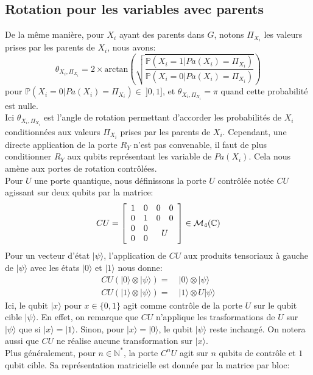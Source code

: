 \subsection{Rotation pour les variables avec parents}
\label{calcul_multi_rot}
De la même manière, pour $X_i$ ayant des parents dans $G$, notons $\Pi_{X_i}$ les valeurs prises par les parents de $X_i$, nous avons:
\[
\theta_{X_i,\Pi_{X_i}} = 
2\times\mathrm{arctan}\left(\sqrt{\frac{\displaystyle \mathbb{P}(X_i=1|Pa(X_i)=\Pi_{X_i})}{\displaystyle \mathbb{P}(X_i=0|Pa(X_i)=\Pi_{X_i})}}\right) 
\]
pour $\mathbb{P}(X_i=0|Pa(X_i)=\Pi_{X_i}) \in \ ]0,1]$, et
$\theta_{X_i,\Pi_{X_i}} =  \pi$ quand cette probabilité est nulle.
\\
Ici $\theta_{X_i,\Pi_{X_i}}$ est l'angle de rotation permettant d'accorder les probabilités de $X_i$ conditionnées aux valeurs $\Pi_{X_i}$ prises par les parents de $X_i$. Cependant, une directe application de la porte $R_Y$ n'est pas convenable, il faut de plus conditionner $R_Y$ aux qubits représentant les variable de $Pa(X_i)$.
Cela nous amène aux portes de rotation contrôlées.
\\
Pour $U$ une porte quantique, nous définissons la porte $U$ contrôlée notée $CU$ agissant sur deux qubits par la matrice:
\[CU =
\left[
\begin{array}{cccc}
    1 & 0 & 0 & 0 \\
    0 & 1 & 0 & 0 \\
    0 & 0 & \multicolumn{2}{c}{\smash{\raisebox{-.5\normalbaselineskip}{$U$}}} \\
    0 & 0 &  & 
\end{array}
\right]
\in \mathcal{M}_{4}(\mathbb{C})
\]
Pour un vecteur d'état $|\psi\rangle$, l'application de $CU$ aux produits tensoriaux à gauche de $|\psi\rangle$ avec les états $|0\rangle$ et $|1\rangle$ nous donne:
\begin{align*}
CU (|0\rangle \otimes |\psi\rangle) =&\ |0\rangle \otimes |\psi\rangle \\
CU (|1\rangle \otimes |\psi\rangle) =&\ |1\rangle \otimes U|\psi\rangle 
\end{align*}
Ici, le qubit $|x\rangle$ pour $x\in\{0,1\}$ agit comme contrôle de la porte $U$ sur le qubit cible $|\psi\rangle$. En effet, on remarque que $CU$ n'applique les trasformations de $U$ sur $|\psi\rangle$ que si $|x\rangle = |1\rangle$. Sinon, pour $|x\rangle = |0\rangle$, le qubit $|\psi\rangle$ reste inchangé. On notera aussi que $CU$ ne réalise aucune transformation sur $|x\rangle$. 
\\
Plus généralement, pour $n\in\mathbb{N}^*$, la porte $C^nU$ agit sur $n$ qubits de contrôle et $1$ qubit cible. Sa représentation matricielle est donnée par la matrice par bloc:
